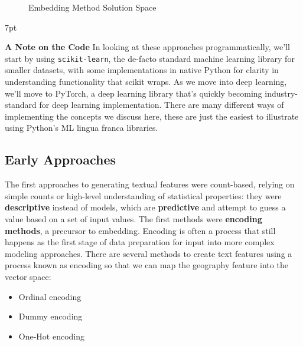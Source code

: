 \documentclass[11pt, table]{diazessay} %
\newenvironment{formal}{%
  \def\FrameCommand{%
    \hspace{1pt}%
    {\color{w_lightblue}\vrule width 2pt}%
    {\color{formalshade}\vrule width 4pt}%
    \colorbox{formalshade}%
  }%
  \MakeFramed{\advance\hsize-\width\FrameRestore}%
  \noindent\hspace{-4.55pt}%
  \begin{adjustwidth}{}{7pt}%
  \vspace{2pt}\vspace{2pt}%
}
{%
  \vspace{2pt}\end{adjustwidth}\endMakeFramed%
}
\begin{document}
\begin{sloppypar}
\begin{figure}[H]
    \centering
     \caption{Embedding Method Solution Space}
\end{figure}

\begin{formal}
\textbf{A Note on the Code}
In looking at these approaches programmatically, we'll start by using \texttt{scikit-learn}, the de-facto standard machine learning library for smaller datasets, with some implementations in native Python for clarity in understanding functionality that scikit wraps.  As we move into deep learning, we'll move to PyTorch, a deep learning library that's quickly becoming industry-standard for deep learning implementation. There are many different ways of implementing the concepts we discuss here, these are just the easiest to illustrate using Python's ML lingua franca libraries. 
\end{formal}

\subsection{Early Approaches}

The first approaches to generating textual features were count-based, relying on simple counts or high-level understanding of statistical properties: they were \textbf{descriptive} instead of models, which are \textbf{predictive} and attempt to guess a value based on a set of input values.  The first methods were \textbf{encoding methods}, a precursor to embedding. Encoding is often a process that still happens as the first stage of data preparation for input into more complex modeling approaches.  There are several methods to create text features using a process known as encoding so that we can map the geography feature into the vector space:

\begin{itemize}
  \item Ordinal encoding   
  \item Dummy encoding 
  \item One-Hot encoding
\end{itemize}


\end{sloppypar}
\end{document}
